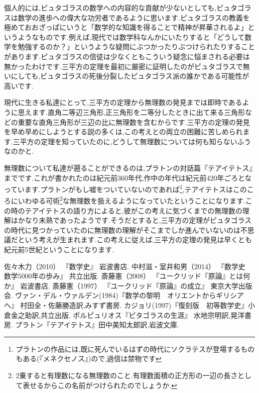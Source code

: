 \documentclass[./main]{subfiles}
\begin{document}
個人的には,ピュタゴラスの数学への内容的な貢献が少ないとしても,ピュタゴラスは数学の進歩への偉大な功労者であるように思います.ピュタゴラスの教義を極めておおざっぱにいうと「数学的な知識を得ることで精神が昇華されるよ」というようなものです.例えば,現代では数学科なんかにいたりすると「どうして数学を勉強するのか？」というような疑問にぶつかったりぶつけられたりすることがあります.ピュタゴラスの信徒は少なくともこういう疑念に悩まされる必要は無かったわけです.三平方の定理を最初に厳密に証明したのがピュタゴラスで無いにしても,ピュタゴラスの死後分裂したピュタゴラス派の誰かである可能性が高いです.


現代に生きる私達にとって,三平方の定理から無理数の発見までは即時であるように思えます.直角二等辺三角形,正三角形を二等分したときに出て来る三角形などの重要な直角三角形が三辺の比に無理数を含むからです.三平方の定理の発見を早め早めにしようとする説の多くは,この考えとの両立の困難に苦しめられます.三平方の定理を知っていたのに,どうして無理数については何も知らないふうなのかと.

無理数について私達が遡ることができるのは,プラトンの対話篇『テアイテトス』までです.これが書かれたのは紀元前360年代,作中の年代は紀元前420年ごろとなっています.プラトンがもし嘘をついていないのであれば\footnote{プラトンの作品には,既に死んでいるはずの時代にソクラテスが登場するものもある(『メネクセノス』)ので,過信は禁物です},テアイテトスはこのころにいわゆる可術\footnote{ \cite{saito2} 2乗すると有理数になる無理数のこと.有理数面積の正方形の一辺の長さとして表せるからこの名前がつけられたのでしょうか.}な無理数を扱えるようになっていたということになります.この時のテアイテトスの語り方によると,彼がこの考えに気づくまでの無理数の理解はかなり未熟であったようです.そうだとすると,三平方の定理がピュタゴラスの時代に見つかっていたのに無理数の理解がそこまでしか進んでいないのは不思議だという考えが生まれます.この考えに従えば,三平方の定理の発見は早くとも紀元前5世紀ということになります.



\begin{thebibliography}{9}
 佐々木力（2010） 『数学史』 岩波書店.
 中村滋・室井和男（2014） 『数学史　数学5000年の歩み』 共立出版.
 斎藤憲（2008） 『ユークリッド『原論』とは何か』 岩波書店.
 斎藤憲（1997） 『ユークリッド『原論』の成立』 東京大学出版会.
 ヴァン・デル・ウァルデン(1984)『数学の黎明　オリエントからギリシアへ』 村田全・佐藤勝造訳,みすず書房.
 カジョリ(1997)『復刻版　初等数学史』小倉金之助訳,共立出版.
 ポルピュリオス『ピタゴラスの生涯』 水地宗明訳,晃洋書房.
 プラトン『テアイテトス』田中美知太郎訳,岩波文庫.
\end{thebibliography}
\end{document}
